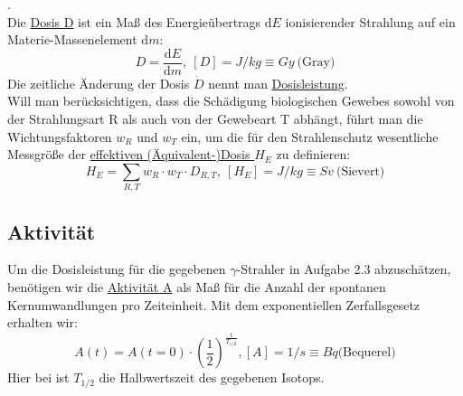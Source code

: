 \begin{definition}[Dosisgrößen].\\
	Die \underline{Dosis D} ist ein Maß des Energieübertrags $\mathrm{d}E$ ionisierender Strahlung 		auf ein Materie-Massenelement $\mathrm{d}m$:
\begin{equation}\label{eq:dosis}
	D = \frac{\mathrm{d}E}{\mathrm{d}m},\ [D] = J/kg \equiv Gy\ \textrm{(Gray)}
\end{equation}
Die zeitliche Änderung der Dosis $\dot{D}$ nennt man \underline{Dosisleistung}.\\
Will man berücksichtigen, dass die Schädigung biologischen Gewebes sowohl von der Strahlungsart R als auch von der Gewebeart T abhängt, führt man die Wichtungsfaktoren $w_R$ und $w_T$ ein, um die für den Strahlenschutz wesentliche Messgröße der \underline{effektiven (Äquivalent-)Dosis $H_E$} zu definieren:
\begin{equation}
	H_E = \sum_{R,T} w_R \cdot w_T \cdot D_{R,T},\ [H_E]=J/kg \equiv Sv\ \textrm{(Sievert)}
\end{equation}
\end{definition}

\subsection{Aktivität}
Um die Dosisleistung für die gegebenen $\gamma$-Strahler in Aufgabe 2.3 abzuschätzen, benötigen wir die \underline{Aktivität A} als Maß für die Anzahl der spontanen Kernumwandlungen pro Zeiteinheit. Mit dem exponentiellen Zerfallsgesetz erhalten wir:
\begin{equation} \label{eq:aktivitaet}
	A(t)=A(t=0) \cdot \left(\frac{1}{2}\right)^{\frac{t}{T_{1/2}}}, [A] = 1/s \equiv Bq \textrm{(Bequerel)}
\end{equation}
Hier bei ist $T_{1/2}$ die Halbwertszeit des gegebenen Isotops.

